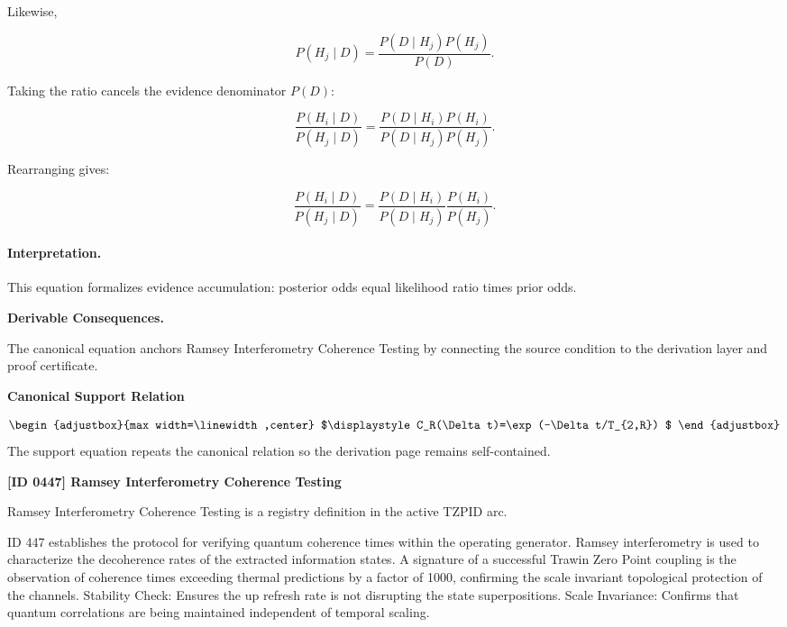 Likewise,

\begin{equation}
P(H_j\mid D)
=
\frac{P(D\mid H_j)P(H_j)}
{P(D)} .
\end{equation}

Taking the ratio cancels the evidence denominator $P(D)$:

\begin{equation}
\frac{P(H_i\mid D)}
{P(H_j\mid D)}
=
\frac{P(D\mid H_i)P(H_i)}
{P(D\mid H_j)P(H_j)} .
\end{equation}

Rearranging gives:

\begin{equation}
\boxed{
\frac{P(H_i\mid D)}
{P(H_j\mid D)}
=
\frac{P(D\mid H_i)}
{P(D\mid H_j)}
\frac{P(H_i)}
{P(H_j)} .
}
\end{equation}

\paragraph{Interpretation.}
This equation formalizes evidence accumulation: posterior odds equal likelihood ratio times prior odds.

\par\vspace{0.35em}
\noindent\textbf{Derivable Consequences.}\quad
\begingroup
\footnotesize
\raggedright
The canonical equation anchors Ramsey Interferometry Coherence Testing by connecting the source condition to the derivation layer and proof certificate.
\par\endgroup

\noindent\textbf{Canonical Support Relation}\par
\[
\begin{adjustbox}{max width=\linewidth,center}
$\displaystyle
C_R(\Delta t)=\exp(-\Delta t/T_{2,R})
$
\end{adjustbox}
\]
\noindent The support equation repeats the canonical relation so the derivation page remains self-contained.\par

\clearpage
\noindent\textbf{[ID 0447] Ramsey Interferometry Coherence Testing}\par
\vspace{0.35em}
\begingroup\small
{}
Ramsey Interferometry Coherence Testing is a registry definition in the active TZPID arc.

ID 447 establishes the protocol for verifying quantum coherence times within the operating generator. Ramsey interferometry is used to characterize the decoherence rates of the extracted information states. A signature of a successful Trawin Zero Point coupling is the observation of coherence times exceeding thermal predictions by a factor of 1000, confirming the scale invariant topological protection of the channels. Stability Check: Ensures the up refresh rate is not disrupting the state superpositions. Scale Invariance: Confirms that quantum correlations are being maintained independent of temporal scaling.

